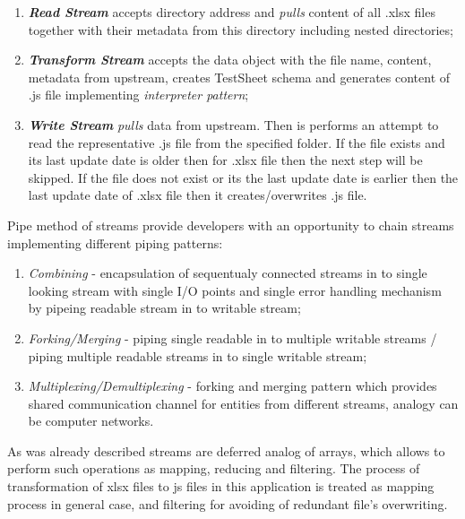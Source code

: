\begin{enumerate}
	\item \textbf{\textit{Read Stream}} accepts directory address and \textit{pulls} content of all .xlsx files together with their metadata  from this directory including nested directories;
	\item \textbf{\textit{Transform Stream}} accepts the data object with the file name, content, metadata from upstream, creates TestSheet schema and generates content of .js file implementing \textit{interpreter pattern}; 
	\item \textbf{\textit{Write Stream}} \textit{pulls} data from upstream. Then is performs an attempt to read the representative .js file from the  specified folder. If the file exists and its last update date is older then for .xlsx file then the next step will be skipped. If the file does not exist or its the last update date is earlier then the last update date of .xlsx file then it creates/overwrites .js file.
\end{enumerate}

Pipe method of streams provide developers with an opportunity to chain streams implementing different piping patterns:
\begin{enumerate}
	\item \textit{Combining} - encapsulation of sequentualy connected streams in to single looking stream with single I/O points and single error handling mechanism by pipeing readable stream in to writable stream;
	\item \textit{Forking/Merging} - piping single readable in to multiple writable streams /  piping multiple readable streams in to single writable stream;
	\item \textit{Multiplexing/Demultiplexing} - forking and merging pattern which provides shared communication channel for entities from different streams, analogy can be computer networks.
\end{enumerate}

As was already described streams are deferred analog of arrays, which allows to perform such operations as mapping, reducing and filtering. The process of transformation of xlsx files to js files in this application is treated as mapping process in general case, and filtering for avoiding of redundant file's overwriting.

